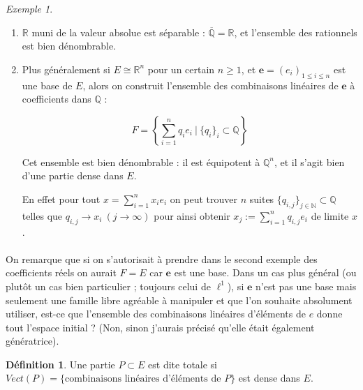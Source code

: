 \documentclass[]{article}
\theoremstyle{remark}
\newtheorem{myexmpl}{Exemple}
\theoremstyle{definition}
\newtheorem{mydef}{Définition}
\newcommand{\DS}{\displaystyle}
\begin{document}
	\begin{myexmpl}
		\leavevmode
		\begin{enumerate}
			\item $\mathbb{R}$ muni de la valeur absolue est séparable : $\overline{\mathbb{Q}} = \mathbb{R}$, et l'ensemble des rationnels est bien dénombrable.
			
			\item Plus généralement si $E \cong \mathbb{R}^n$ pour un certain $n \geqslant 1$, et $\mathbf{e}=(e_i)_{1 \leqslant i \leqslant n}$ est une base de $E$, alors on construit l'ensemble des combinaisons linéaires de $\mathbf{e}$ à coefficients dans $\mathbb{Q}$ :
			
			$$F = \left\{\DS \sum_{i = 1}^{n} q_i e_i ~ | ~ \{q_i\}_i \subset \mathbb{Q} \right\}$$
			
			Cet ensemble est bien dénombrable : il est équipotent à $\mathbb{Q}^n$, et il s'agit bien d'une partie dense dans $E$.
			
			En effet pour tout $\DS x = \sum_{i = 1}^n x_i e_i$ on peut trouver $n$ suites $\{q_{i, j}\}_{j \in \mathbb{N}} \subset \mathbb{Q}$ telles que $q_{i, j} \to x_i ~ (j \to \infty)$ pour ainsi obtenir $\DS x_j := \sum_{i = 1}^{n} q_{i, j} e_i$ de limite $x$.
		\end{enumerate}
	\end{myexmpl}
	
	\paragraph*{}
	
	On remarque que si on s'autorisait à prendre dans le second exemple des coefficients réels on aurait $F = E$ car $\mathbf{e}$ est une base. Dans un cas plus général (ou plutôt un cas bien particulier ; toujours celui de $\ell^1$), si $\mathbf{e}$ n'est pas une base mais seulement une famille libre agréable à manipuler et que l'on souhaite absolument utiliser, est-ce que l'ensemble des combinaisons linéaires d'éléments de $e$ donne tout l'espace initial ? (Non, sinon j'aurais précisé qu'elle était également génératrice).
		
	\begin{mydef}
		Une partie $P \subset E$ est dite totale si $Vect(P) = \{\text{combinaisons linéaires d'éléments de $P$}\}$ est dense dans $E$.
	\end{mydef}
	
\end{document}
